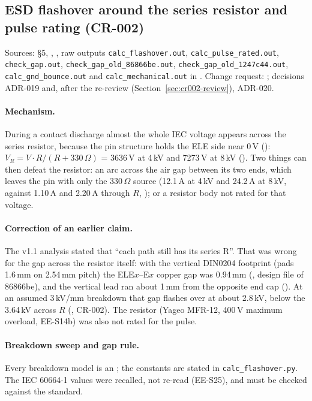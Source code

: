 \subsection{ESD flashover around the series resistor and pulse rating (CR-002)}
\label{sec:esd}
Sources:  \S5,
,
, raw outputs
\nolinkurl{calc_flashover.out}, \nolinkurl{calc_pulse_rated.out},
\nolinkurl{check_gap.out}, \nolinkurl{check_gap_old_86866be.out},
\nolinkurl{check_gap_old_1247c44.out}, \nolinkurl{calc_gnd_bounce.out} and
\nolinkurl{calc_mechanical.out} in . Change request:
; decisions ADR-019 and, after the re-review (Section~\ref{sec:cr002-review}),
ADR-020.

\paragraph{Mechanism.} During a contact discharge almost the whole IEC voltage
appears across the series resistor, because the pin structure holds the ELE side
near 0\,V ():
$V_R = V \cdot R/(R + 330\,\Omega)$ = 3636\,V at 4\,kV and 7273\,V at 8\,kV
(). Two things can then defeat the resistor: an arc across the air
gap between its two ends, which leaves the pin with only the 330\,$\Omega$ source
(12.1\,A at 4\,kV and 24.2\,A at 8\,kV, against 1.10\,A and 2.20\,A through $R$,
); or a resistor body not rated for that voltage.

\paragraph{Correction of an earlier claim.} The v1.1 analysis stated that ``each
path still has its series R''. That was wrong for the gap across the resistor
itself: with the vertical DIN0204 footprint (pads 1.6\,mm on 2.54\,mm pitch) the
ELE$x$--E$x$ copper gap was 0.94\,mm (, design file of 86866be),
and the vertical lead ran about 1\,mm from the opposite end cap
(). At an assumed 3\,kV/mm breakdown that gap flashes over at about
2.8\,kV, below the 3.64\,kV across $R$ (, CR-002). The resistor
(Yageo MFR-12, 400\,V maximum overload,  EE-S14b) was also not rated
for the pulse.

\paragraph{Breakdown sweep and gap rule.} Every breakdown model is an
; the constants are stated in \nolinkurl{calc_flashover.py}. The
IEC 60664-1 values were recalled, not re-read (EE-S25), and must be checked against
the standard.

